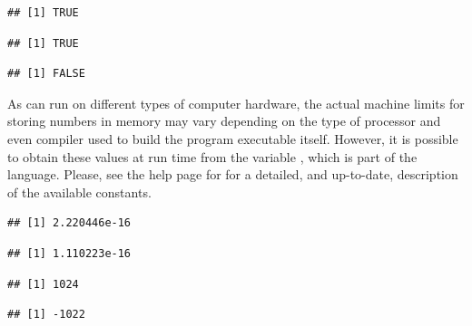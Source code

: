 \documentclass[krantz2]{krantz}\usepackage{knitr}%
\begin{document}
\begin{explainbox}
\begin{knitrout}\footnotesize
{}\color{fgcolor}\begin{kframe}
\begin{alltt}
 \hlopt{==}  \hlopt{+} 
\end{alltt}
\begin{verbatim}
## [1] TRUE
\end{verbatim}
\begin{alltt}
 \hlopt{==}  \hlopt{+} 
\end{alltt}
\begin{verbatim}
## [1] TRUE
\end{verbatim}
\begin{alltt}
 \hlopt{==} 
\end{alltt}
\begin{verbatim}
## [1] FALSE
\end{verbatim}
\end{kframe}
\end{knitrout}

As \Rpgrm can run on different types of computer hardware, the actual machine limits for storing numbers in memory may vary depending on the type of processor and even compiler used to build the \Rpgrm program executable itself. However, it is possible to obtain these values at run time from the variable , which is part of the \Rlang language. Please, see the help page for  for a detailed, and up-to-date, description of the available constants.

\begin{knitrout}\footnotesize
{}\color{fgcolor}\begin{kframe}
\begin{alltt}
\hlopt{$}
\end{alltt}
\begin{verbatim}
## [1] 2.220446e-16
\end{verbatim}
\begin{alltt}
\hlopt{$}
\end{alltt}
\begin{verbatim}
## [1] 1.110223e-16
\end{verbatim}
\begin{alltt}
\hlopt{$}
\end{alltt}
\begin{verbatim}
## [1] 1024
\end{verbatim}
\begin{alltt}
\hlopt{$}
\end{alltt}
\begin{verbatim}
## [1] -1022
\end{verbatim}
\end{kframe}
\end{knitrout}


\end{explainbox}
\end{document}
